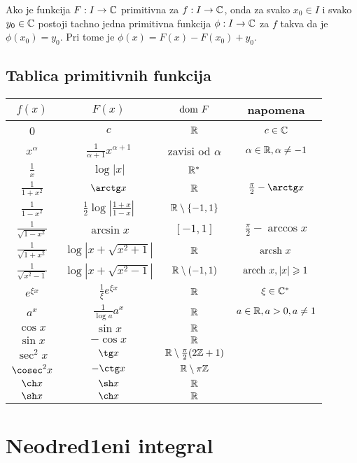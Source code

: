 \documentclass[../main.tex]{subfiles}
\begin{document}
\begin{posl}
Ako je funkcija $F:I \to \mathbb{C}$ primitivna za $f: I \to \mathbb{C}$, onda za svako $x_0 \in I$ i svako $y_0 \in \mathbb{C}$ postoji tachno jedna primitivna funkcija $\phi : I \to \mathbb{C}$ za $f$ takva da je $\phi (x_0) = y_0$. Pri tome je $\phi(x)=F(x)-F(x_0)+y_0$.
\end{posl}
\newpage
\subsection{Tablica primitivnih funkcija}
\begin{center}
\vspace{0.5cm}
\begin{tabular}{||c  c  c  c||} 
 \hline
 $f(x)$ & $F(x)$ & $\text{\latin {dom }}F$ & napomena \\ [0.5ex] 
 \hline\hline
 0 & $c$ & $\mathbb{R}$ & $c\in \mathbb{C}$ \\ [2ex] 
 $x^{\alpha}$ & $\frac{1}{\alpha +1} x^{\alpha +1}$ & zavisi od $\alpha$ & $\alpha \in \mathbb{R} , \alpha \ne -1$ \\[2ex] 
 $\frac{1}{x}$ & $\log|x|$ & $\mathbb{R}^{*}$ &  \\[2ex] 
 $\frac{1}{1+x^2}$ & $\arctg x$ & $\mathbb{R}$ & $\frac{\pi}{2} -\arctg x$ \\[2ex] 
  $\frac{1}{1-x^2}$ & $\frac{1}{2} \log |\frac{1+x}{1-x}|$ & $\mathbb{R} \setminus \{-1,1\} $ &  \\ [2ex] 
 $\frac{1}{\sqrt{1-x^2}}$ & $\arcsin x$ & $[-1,1]$ & $\frac{\pi}{2}-\arccos x$ \\ [2ex] 
 $\frac{1}{\sqrt{1+x^2}}$ & $\log |x+\sqrt{x^2+1}|$ & $ \mathbb{R} $ & $\text{\latin {arcsh }} x$\\[2ex] 
 $\frac{1}{\sqrt{x^2-1}}$ & $\log |x+\sqrt{x^2-1}|$ & $\mathbb{R}\setminus(-1,1)$ & $\text{\latin {arcch }} x, |x|\geqslant 1$ \\[2ex] 
 $e^{\xi x}$ & $\frac{1}{\xi} e^{\xi x}$ & $\mathbb{R}$ & $\xi \in \mathbb{C}^{*}$ \\[2ex] 
  $a^x$ & $\frac{1}{\log a} a^x $ & $\mathbb{R} $ & $a\in \mathbb{R}, a>0, a\ne 1$ \\ [2ex] 
  $\cos x$ & $\sin x$ & $\mathbb{R}$ &  \\ [2ex] 
 $\sin x$ & $ -\cos x$ & $\mathbb{R}$ &\\[2ex] 
 $\sec^2 x$ & $\tg x$ & $\mathbb{R} \setminus \frac{\pi}{2}(2\mathbb{Z}+1)$ &  \\[2ex]
 $\cosec^2 x$ & $-\ctg x$ & $\mathbb{R} \setminus \pi \mathbb{Z}$ &  \\[2ex] 
  $\ch x$ & $\sh x$ & $\mathbb{R} $ &  \\ [2ex] 
  $\sh x$ & $\ch x$ & $\mathbb{R} $ &  \\ [2ex] 
 \hline
\end{tabular}
\end{center}
\section {Neodred1eni integral}
\end{document}
